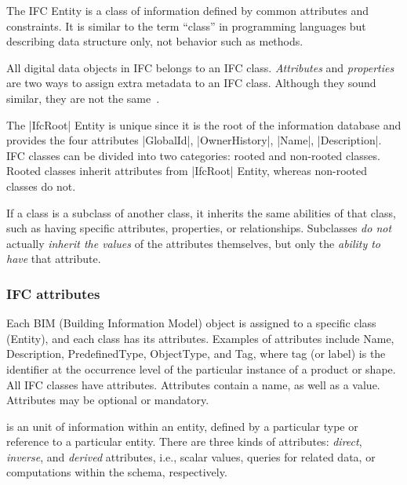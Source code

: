 \begin{coding}
\begin{definition}
The IFC Entity is a class of information defined by common attributes and constraints. 
It is similar to the term “class” in  programming languages but describing data structure only, not behavior such as methods. 
\end{definition}

All digital data objects in IFC belongs to an IFC class. 
\emph{Attributes} and \emph{properties} are two ways to assign extra metadata to an IFC class. Although they sound similar, they are not the same~\cite{}. 

The |IfcRoot| Entity is unique since it is the root of the information database and provides the four attributes |GlobalId|, |OwnerHistory|, |Name|, |Description|.
IFC classes can be divided into two categories: rooted and non-rooted classes. 
Rooted classes inherit attributes from |IfcRoot| Entity, whereas non-rooted classes do not. 

If a class is a subclass of another class, it inherits the same abilities of that class, such as having specific attributes, properties, or relationships. Subclasses \emph{do not} actually \emph{inherit the values} of the attributes themselves, but only the \emph{ability to have} that attribute. 


\subsubsection*{IFC attributes}\label{sect:4-4-2-1}



Each BIM (Building Information Model) object is assigned to a specific class (Entity), and each class has its attributes. Examples of attributes include Name, Description, PredefinedType, ObjectType, and Tag, where tag (or label) is the identifier at the occurrence level of the particular instance of a product or shape. All IFC classes have attributes. Attributes contain a name, as well as a value.  Attributes may be optional or mandatory. 

\begin{definition}
is an unit of information within an entity, defined by a particular type or reference to a particular entity.
There are three kinds of attributes: \emph{direct}, \emph{inverse}, and \emph{derived} attributes, i.e., scalar values, queries for related data, or computations within the schema, respectively.
\end{definition}


\end{coding}
